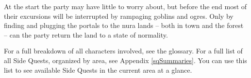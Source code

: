 \begin{multicols}{2}
\begin{exampletext}
\end{exampletext}

At the start the party may have little to worry about, but before the end most of their excursions will be interrupted by rampaging goblins and ogres.
Only by finding and plugging the portals to the nura lands -- both in \gls{town} and the forest -- can the party return the land to a state of normality.

For a full breakdown of all characters involved, see the glossary.
For a full list of all Side Quests, organized by area, see Appendix \ref{sqSummaries}.
You can use this list to see available Side Quests in the current area at a glance.

\end{multicols}

